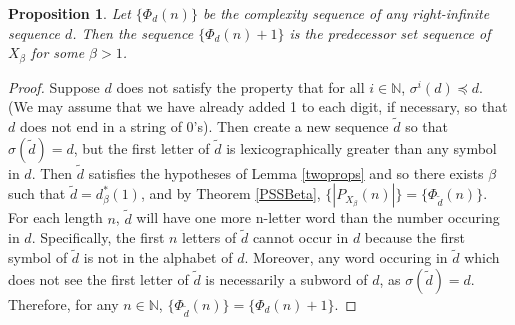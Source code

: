 \documentclass{amsart}
\newtheorem{proposition}[theorem]{Proposition}
\theoremstyle{definition}
\numberwithin{equation}{section}
\begin{document}
\begin{proposition}\label{PlusOne}
Let $\{\Phi_d(n)\}$ be the complexity sequence of any right-infinite sequence $d$. Then the sequence $\{\Phi_d(n)+1\}$ is the predecessor set sequence of $X_\beta$ for some $\beta > 1$.
\end{proposition}

\begin{proof}
Suppose $d$ does not satisfy the property that for all $i \in \mathbb{N}$, $\sigma^i(d) \preceq d$. (We may assume that we have already added 1 to each digit, if necessary, so that $d$ does not end in a string of 0's). Then create a new sequence $\tilde{d}$ so that $\sigma(\tilde{d}) = d$, but the first letter of $\tilde{d}$ is lexicographically greater than any symbol in $d$. Then $\tilde{d}$ satisfies the hypotheses of Lemma \ref{twoprops} and so there exists $\beta$ such that $\tilde{d} = d_\beta^*(1)$, and by Theorem \ref{PSSBeta}, $\{|P_{X_\beta}(n)|\} = \{\Phi_{\tilde{d}}(n)\}$. For each length $n$, $\tilde{d}$ will have one more n-letter word than the number occuring in $d$. Specifically, the first $n$ letters of $\tilde{d}$ cannot occur in $d$ because the first symbol of $\tilde{d}$ is not in the alphabet of $d$. Moreover, any word occuring in $\tilde{d}$ which does not see the first letter of $\tilde{d}$ is necessarily a subword of $d$, as $\sigma(\tilde{d}) = d$. Therefore, for any $n \in \mathbb{N}$, $\{\Phi_{\tilde{d}}(n)\} = \{\Phi_d(n) + 1\}$.
\end{proof}

\end{document}
